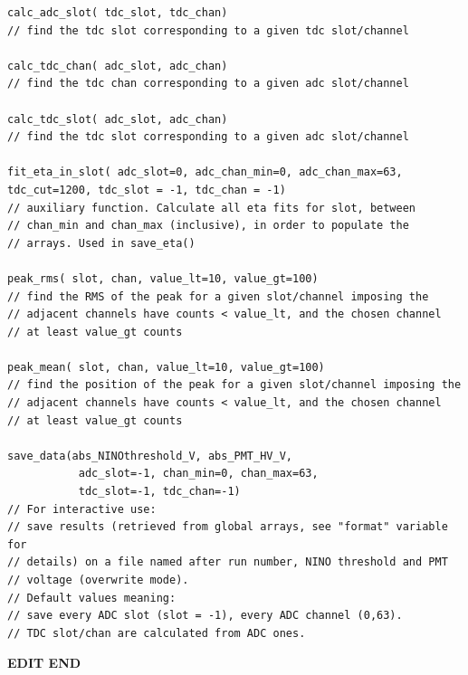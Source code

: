\documentclass{article}
\begin{document}
\begin{verbatim}
calc_adc_slot( tdc_slot, tdc_chan)
// find the tdc slot corresponding to a given tdc slot/channel

calc_tdc_chan( adc_slot, adc_chan)
// find the tdc chan corresponding to a given adc slot/channel

calc_tdc_slot( adc_slot, adc_chan)
// find the tdc slot corresponding to a given adc slot/channel

fit_eta_in_slot( adc_slot=0, adc_chan_min=0, adc_chan_max=63, tdc_cut=1200, tdc_slot = -1, tdc_chan = -1)
// auxiliary function. Calculate all eta fits for slot, between
// chan_min and chan_max (inclusive), in order to populate the
// arrays. Used in save_eta()

peak_rms( slot, chan, value_lt=10, value_gt=100)
// find the RMS of the peak for a given slot/channel imposing the
// adjacent channels have counts < value_lt, and the chosen channel
// at least value_gt counts

peak_mean( slot, chan, value_lt=10, value_gt=100)
// find the position of the peak for a given slot/channel imposing the
// adjacent channels have counts < value_lt, and the chosen channel
// at least value_gt counts

save_data(abs_NINOthreshold_V, abs_PMT_HV_V, 
	       adc_slot=-1, chan_min=0, chan_max=63, 
	       tdc_slot=-1, tdc_chan=-1)
// For interactive use:
// save results (retrieved from global arrays, see "format" variable for
// details) on a file named after run number, NINO threshold and PMT
// voltage (overwrite mode).
// Default values meaning:
// save every ADC slot (slot = -1), every ADC channel (0,63). 
// TDC slot/chan are calculated from ADC ones.
\end{verbatim}

\textbf{EDIT END}
\end{document}
